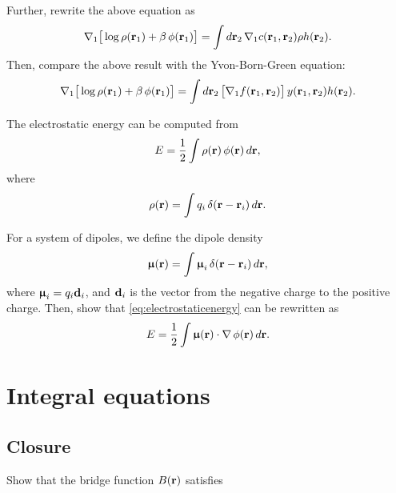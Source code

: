 \documentclass{book}
\begin{document}


Further, rewrite the above equation as
%
\[
   \nabla_1
   \big[
     \log \rho(\boldsymbol{\mathbf{r}}_1) + \beta \, \phi(\boldsymbol{\mathbf{r}}_1)
   \big]
  =
 \int d \boldsymbol{\mathbf{r}}_2 \,
    \nabla_1 c(\boldsymbol{\mathbf{r}}_1, \boldsymbol{\mathbf{r}}_2)
    \rho h(\boldsymbol{\mathbf{r}}_2).
\]
%
Then, compare the above result with the Yvon-Born-Green equation:
%
\begin{align}
   \nabla_1
   \big[
     \log \rho(\boldsymbol{\mathbf{r}}_1) + \beta \, \phi(\boldsymbol{\mathbf{r}}_1)
   \big]
  =
 \int d \boldsymbol{\mathbf{r}}_2 \,
    \big[ \nabla_1 f(\boldsymbol{\mathbf{r}}_1, \boldsymbol{\mathbf{r}}_2) \big]
    \, y(\boldsymbol{\mathbf{r}}_1, \boldsymbol{\mathbf{r}}_2)
    h(\boldsymbol{\mathbf{r}}_2).
\end{align}





The electrostatic energy can be computed from
\begin{equation}
  E = \frac{1}{2} \int \rho(\vr) \, \phi(\vr) \, d\vr,
  \label{eq:electrostaticenergy}
\end{equation}
where
\[
  \rho(\boldsymbol{\mathbf{r}}) = \int q_i \, \delta(\boldsymbol{\mathbf{r}} - \boldsymbol{\mathbf{r}}_i) \, d\boldsymbol{\mathbf{r}}.
\]

For a system of dipoles, we define the dipole density
\[
  \boldsymbol{\mathbf{\upmu}}(\boldsymbol{\mathbf{r}}) = \int \boldsymbol{\mathbf{\upmu}}_i \, \delta(\boldsymbol{\mathbf{r}} - \boldsymbol{\mathbf{r}}_i) \, d\boldsymbol{\mathbf{r}},
\]
where $\boldsymbol{\mathbf{\upmu}}_i = q_i \boldsymbol{\mathbf{d}}_i$,
and $\boldsymbol{\mathbf{d}}_i$ is the vector from the negative charge to the positive charge.
%
Then, show that \eqref{eq:electrostaticenergy} can be rewritten as
\[
  E = \frac{1}{2} \int \boldsymbol{\mathbf{\upmu}}(\boldsymbol{\mathbf{r}}) \cdot \nabla \, \phi(\boldsymbol{\mathbf{r}}) \, d\boldsymbol{\mathbf{r}}.
\]







\chapter{Integral equations}



\section{Closure}




Show that the bridge function $B(\boldsymbol{\mathbf{r}})$ satisfies\cite{kast2012}
\end{document}
